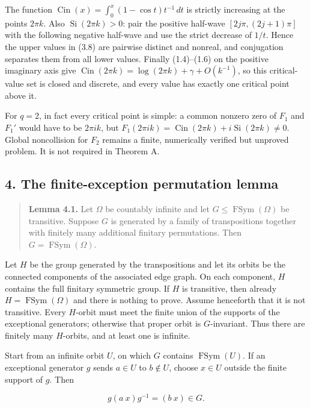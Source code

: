 \documentclass[11pt]{article}
\theoremstyle{keio}
\theoremstyle{definition}
\theoremstyle{remark}
\begin{document}
The function \(\operatorname{Cin}(x)=\int_0^x(1-\cos t)t^{-1}\,dt\) is
strictly increasing at the points \(2\pi k\). Also
\(\operatorname{Si}(2\pi k)>0\): pair the positive half-wave
\([2j\pi,(2j+1)\pi]\) with the following negative half-wave and use the
strict decrease of \(1/t\). Hence the upper values in (3.8) are pairwise
distinct and nonreal, and conjugation separates them from all lower values.
Finally (1.4)--(1.6) on the positive imaginary axis give
\(\operatorname{Cin}(2\pi k)=\log(2\pi k)+\gamma+O(k^{-1})\), so this critical-value set
is closed and discrete, and every value has exactly one critical point above
it.

For \(q=2\), in fact every critical point is simple: a common nonzero zero
of \(F_1\) and \(F_1'\) would have to be \(2\pi ik\), but
\(F_1(2\pi ik)=\operatorname{Cin}(2\pi k)+i\operatorname{Si}(2\pi k)\ne0\).
Global noncollision for \(F_2\) remains a finite, numerically verified but
unproved problem. It is not required in Theorem A.

\subsection{4. The finite-exception permutation lemma}

\begin{quote}
\textbf{Lemma 4.1.} Let \(\Omega\) be countably infinite and let
\(G\leq\operatorname{FSym}(\Omega)\) be transitive. Suppose \(G\) is
generated by a family of transpositions together with finitely many
additional finitary permutations. Then \(G=\operatorname{FSym}(\Omega)\).
\end{quote}

Let \(H\) be the group generated by the transpositions and let its orbits be
the connected components of the associated edge graph. On each component,
\(H\) contains the full finitary symmetric group. If \(H\) is transitive,
then already \(H=\operatorname{FSym}(\Omega)\) and there is nothing to
prove. Assume henceforth that it is not transitive. Every \(H\)-orbit must
meet the finite union of the supports of the exceptional generators;
otherwise that proper orbit is \(G\)-invariant. Thus there are finitely many
\(H\)-orbits, and at least one is infinite.

Start from an infinite orbit \(U\), on which \(G\) contains
\(\operatorname{FSym}(U)\). If an exceptional generator \(g\) sends
\(a\in U\) to \(b\notin U\), choose \(x\in U\) outside the finite support
of \(g\). Then

\[
 g(a\ x)g^{-1}=(b\ x)\in G.
\]
\end{document}
